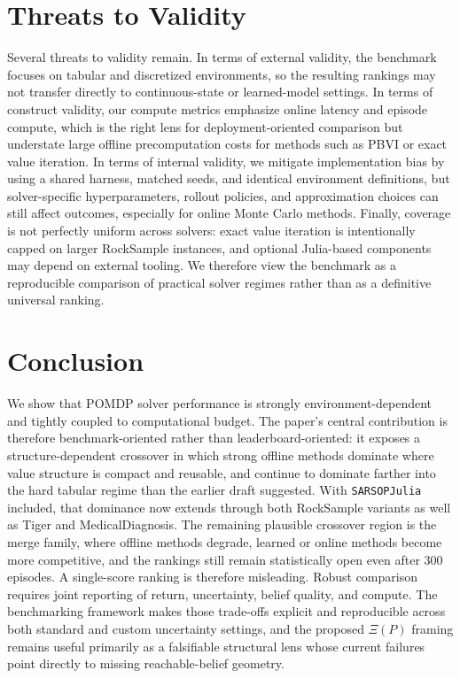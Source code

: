 \documentclass[10pt,twocolumn]{article}
\begin{document}
\section{Threats to Validity}
Several threats to validity remain. In terms of external validity, the benchmark focuses on tabular and discretized environments, so the resulting rankings may not transfer directly to continuous-state or learned-model settings. In terms of construct validity, our compute metrics emphasize online latency and episode compute, which is the right lens for deployment-oriented comparison but understate large offline precomputation costs for methods such as PBVI or exact value iteration. In terms of internal validity, we mitigate implementation bias by using a shared harness, matched seeds, and identical environment definitions, but solver-specific hyperparameters, rollout policies, and approximation choices can still affect outcomes, especially for online Monte Carlo methods. Finally, coverage is not perfectly uniform across solvers: exact value iteration is intentionally capped on larger RockSample instances, and optional Julia-based components may depend on external tooling. We therefore view the benchmark as a reproducible comparison of practical solver regimes rather than as a definitive universal ranking.

\section{Conclusion}
We show that POMDP solver performance is strongly environment-dependent and tightly coupled to computational budget. The paper's central contribution is therefore benchmark-oriented rather than leaderboard-oriented: it exposes a structure-dependent crossover in which strong offline methods dominate where value structure is compact and reusable, and continue to dominate farther into the hard tabular regime than the earlier draft suggested. With \texttt{SARSOPJulia} included, that dominance now extends through both RockSample variants as well as Tiger and MedicalDiagnosis. The remaining plausible crossover region is the merge family, where offline methods degrade, learned or online methods become more competitive, and the rankings still remain statistically open even after 300 episodes. A single-score ranking is therefore misleading. Robust comparison requires joint reporting of return, uncertainty, belief quality, and compute. The benchmarking framework makes those trade-offs explicit and reproducible across both standard and custom uncertainty settings, and the proposed $\Xi(P)$ framing remains useful primarily as a falsifiable structural lens whose current failures point directly to missing reachable-belief geometry.
\end{document}
